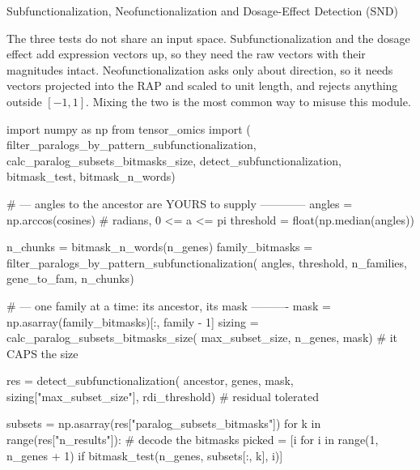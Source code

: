 \begin{recipe}[label=rec:snd]{Subfunctionalization, Neofunctionalization and
  Dosage-Effect Detection (SND)}
\begin{note}
  The three tests do not share an input space. Subfunctionalization and the
  dosage effect add expression vectors up, so they need the raw vectors with
  their magnitudes intact. Neofunctionalization asks only about direction, so
  it needs vectors projected into the RAP and scaled to unit length, and
  rejects anything outside $[-1, 1]$. Mixing the two is the most common way to
  misuse this module.
\end{note}


\begin{codefragment}[language=Python,caption={Fragments to edit: the threshold, and each pattern's criterion}]
import numpy as np
from tensor_omics import (
    filter_paralogs_by_pattern_subfunctionalization,
    calc_paralog_subsets_bitmasks_size,
    detect_subfunctionalization, bitmask_test,
    bitmask_n_words)

# --- angles to the ancestor are YOURS to supply ------------
angles = np.arccos(cosines)        # radians, 0 <= a <= pi
threshold = float(np.median(angles))

n_chunks = bitmask_n_words(n_genes)
family_bitmasks = filter_paralogs_by_pattern_subfunctionalization(
    angles, threshold, n_families, gene_to_fam, n_chunks)

# --- one family at a time: its ancestor, its mask ----------
mask = np.asarray(family_bitmasks)[:, family - 1]
sizing = calc_paralog_subsets_bitmasks_size(
    max_subset_size, n_genes, mask)     # it CAPS the size

res = detect_subfunctionalization(
    ancestor, genes, mask, sizing["max_subset_size"],
    rdi_threshold)                      # residual tolerated

subsets = np.asarray(res["paralog_subsets_bitmasks"])
for k in range(res["n_results"]):       # decode the bitmasks
    picked = [i for i in range(1, n_genes + 1)
              if bitmask_test(n_genes, subsets[:, k], i)]
\end{codefragment}


\end{recipe}
